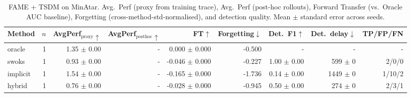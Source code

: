 \begin{table}[t]
\centering
\caption{FAME + TSDM on MinAtar. Avg.~Perf (proxy from training trace), Avg.~Perf (post-hoc rollouts), Forward Transfer (vs.~Oracle AUC baseline), Forgetting (cross-method-std-normalised), and detection quality. Mean $\pm$ standard error across seeds.}
\label{tab:fame-tsdm}
\begin{tabular}{lrrrrrrrr}
\toprule
Method & $n$ & AvgPerf$_{\text{proxy}}\uparrow$ & AvgPerf$_{\text{posthoc}}\uparrow$ & FT$\uparrow$ & Forgetting$\downarrow$ & Det.\ F1$\uparrow$ & Det.\ delay$\downarrow$ & TP/FP/FN \\
\midrule
oracle & 1 & 1.35 $\pm$ 0.00 & - & 0.000 $\pm$ 0.000 & -0.500 & - & - & - \\
swoks & 1 & 0.93 $\pm$ 0.00 & - & -0.046 $\pm$ 0.000 & -0.227 & 1.00 $\pm$ 0.00 & 599 $\pm$ 0 & 2/0/0 \\
implicit & 1 & 1.54 $\pm$ 0.00 & - & -0.165 $\pm$ 0.000 & -1.736 & 0.14 $\pm$ 0.00 & 1449 $\pm$ 0 & 1/10/2 \\
hybrid & 1 & 0.76 $\pm$ 0.00 & - & -0.028 $\pm$ 0.000 & -0.945 & 0.50 $\pm$ 0.00 & 274 $\pm$ 0 & 2/3/1 \\
\bottomrule
\end{tabular}
\end{table}
